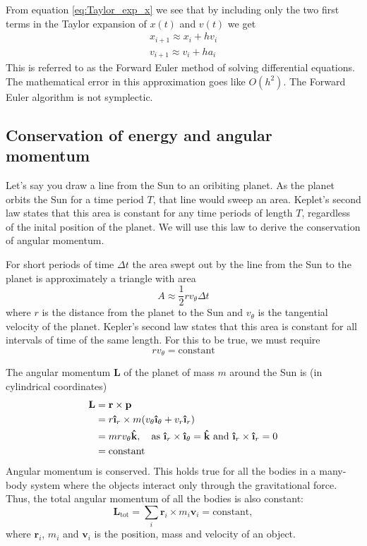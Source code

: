 \documentclass[reprint, english,notitlepage,nofootinbib]{revtex4-1}  %
\newcommand{\ihat}{\boldsymbol{\hat{\textbf{\i}}}}
\newcommand{\khat}{\boldsymbol{\hat{\textbf{k}}}}
\newcommand{\vc}[1]{\mathbf{#1}}
\begin{document}
From equation \eqref{eq:Taylor_exp_x} we see that by including only the two first terms in the Taylor expansion of $x(t)$ and $v(t)$ we get
\begin{align*}
  x_{i+1} \approx x_i + h v_i \\
  v_{i+1} \approx v_i + h a_i
\end{align*}
This is referred to as the Forward Euler method of solving differential equations. The mathematical error in this approximation goes like $O(h^2)$. The Forward Euler algorithm is not symplectic.


\subsection{Conservation of energy and angular momentum}

Let's say you draw a line from the Sun to an oribiting planet. As the planet orbits the Sun for a time period $T$, that line would sweep an area. Keplet's second law states that this area is constant for any time periods of length $T$, regardless of the inital position of the planet. We will use this law to derive the conservation of angular momentum.

For short periods of time $\Delta t$ the area swept out by the line from the Sun to the planet is approximately a triangle with area
\begin{equation*}
  A \approx \frac{1}{2} r v_\theta \Delta t
\end{equation*}
where $r$ is the distance from the planet to the Sun and $v_\theta$ is the tangential velocity of the planet. Kepler's second law states that this area is constant for all intervals of time of the same length. For this to be true, we must require
\begin{equation*}
  r v_\theta = \text{constant}
\end{equation*}

The angular momentum $\vc L$ of the planet of mass $m$ around the Sun is (in cylindrical coordinates)
\begin{align*}
  \vc L &= \vc r \times \vc p \\
  &= r \ihat_r \times m(v_\theta \ihat_\theta + v_r \ihat_r) \\
  &= m r v_\theta \khat, \quad \text{as } \ihat_r \times \ihat_\theta = \khat \text{ and } \ihat_r \times \ihat_r = 0 \\
  &= \text{constant}
\end{align*}
Angular momentum is conserved. This holds true for all the bodies in a many-body system where the objects interact only through the gravitational force. Thus, the total angular momentum of all the bodies is also constant:
\begin{equation*}
  \vc L_{\text{tot}} = \sum_i \vc r_i \times m_i \vc v_i = \text{constant},
\end{equation*}
where $\vc r_i$, $m_i$ and $\vc v_i$ is the position, mass and velocity of an object.
\end{document}
